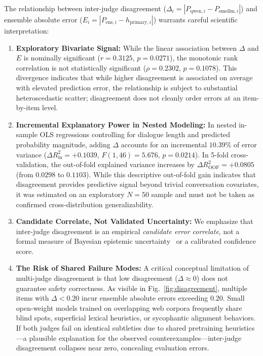 The relationship between inter-judge disagreement ($\Delta_i = |P_{\text{qwen}, i} - P_{\text{smollm}, i}|$) and ensemble absolute error ($E_i = |P_{\text{ens}, i} - h_{\text{primary}, i}|$) warrants careful scientific interpretation:

\begin{enumerate}
    \item \textbf{Exploratory Bivariate Signal:} While the linear association between $\Delta$ and $E$ is nominally significant ($r=0.3125$, $p=0.0271$), the monotonic rank correlation is not statistically significant ($\rho=0.2302$, $p=0.1078$). This divergence indicates that while higher disagreement is associated on average with elevated prediction error, the relationship is subject to substantial heteroscedastic scatter; disagreement does not cleanly order errors at an item-by-item level.
    \item \textbf{Incremental Explanatory Power in Nested Modeling:} In nested in-sample OLS regressions controlling for dialogue length and predicted probability magnitude, adding $\Delta$ accounts for an incremental $10.39\%$ of error variance ($\Delta R^2_{\text{in}}=+0.1039$, $F(1, 46)=5.676$, $p=0.0214$). In 5-fold cross-validation, the out-of-fold explained variance increases by $\Delta R^2_{\text{OOF}}=+0.0805$ (from $0.0298$ to $0.1103$). While this descriptive out-of-fold gain indicates that disagreement provides predictive signal beyond trivial conversation covariates, it was estimated on an exploratory $N=50$ sample and must not be taken as confirmed cross-distribution generalizability.
    \item \textbf{Candidate Correlate, Not Validated Uncertainty:} We emphasize that inter-judge disagreement is an empirical \textit{candidate error correlate}, not a formal measure of Bayesian epistemic uncertainty~\cite{malinin2018predictive,kuhn2023semantic} or a calibrated confidence score.
    \item \textbf{The Risk of Shared Failure Modes:} A critical conceptual limitation of multi-judge disagreement is that low disagreement ($\Delta \approx 0$) does not guarantee safety correctness. As visible in Fig.~\ref{fig:disagreement}, multiple items with $\Delta < 0.20$ incur ensemble absolute errors exceeding $0.20$. Small open-weight models trained on overlapping web corpora frequently share blind spots, superficial lexical heuristics, or sycophantic alignment behaviors. If both judges fail on identical subtleties due to shared pretraining heuristics—a plausible explanation for the observed counterexamples—inter-judge disagreement collapses near zero, concealing evaluation errors.
\end{enumerate}

